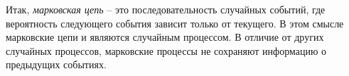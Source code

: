 Итак, \textit{марковская цепь} – это последовательность случайных событий, где вероятность следующего события зависит только от текущего. В этом смысле марковские цепи и  являются случайным процессом. В отличие от других случайных процессов, марковские процессы не сохраняют информацию о предыдущих событиях.

